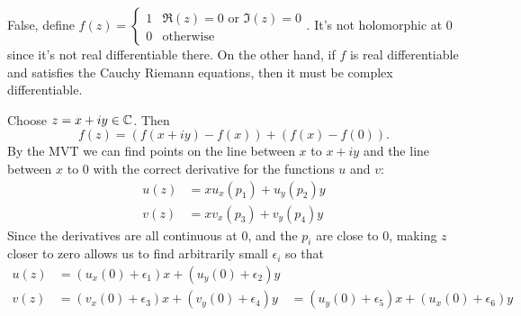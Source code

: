 \documentclass{homework}
\begin{document}
                                                                                                                               \begin{solution}
                                                                                                                               False, define $f(z) = \begin{cases}1&\Re(z) = 0 \text{ or } \Im(z) = 0\\ 0 & \text{otherwise}\end{cases}$. It's not holomorphic at 0 since it's not real differentiable there. On the other hand, if $f$ is real differentiable and satisfies the Cauchy Riemann equations, then it must be complex differentiable.

                                                                                                                               Choose $z = x + iy\in\mathbb{C}$. Then \[f(z) = (f(x + iy) - f(x)) +  (f(x) - f(0)).\] By the MVT we can find points on the line between $x$ to $x+iy$ and the line between $x$ to $0$ with the correct derivative for the functions $u$ and $v$:
                                                                                                                               \begin{align*}
                                                                                                                               u(z) &= xu_x(p_1) + u_y(p_2)y\\
                                                                                                                               v(z) &= xv_x(p_3) +v_y(p_4)y
                                                                                                                               \end{align*}
                                                                                                                               Since the derivatives are all continuous at 0, and the $p_i$ are close to 0, making $z$ closer to zero allows us to find arbitrarily small $\epsilon_i$ so that 
                                                                                                                               \begin{align*}
                                                                                                                               u(z) &= (u_x(0)+\epsilon_1)x + (u_y(0)+\epsilon_2)y \\
                                                                                                                               v(z) &= (v_x(0)+\epsilon_3)x + (v_y(0)+\epsilon_4)y &= (u_y(0)+\epsilon_5)x + (u_x(0)+\epsilon_6)y

\end{align*}
\end{solution}
\end{document}
